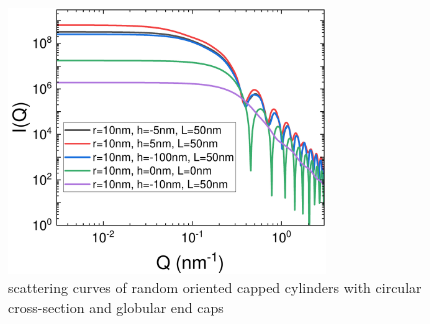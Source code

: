 \begin{figure}[htb]
\begin{center}
\includegraphics[width=0.75\textwidth]{../images/form_factor/cylindrical_obj/capped_cylinder_IQ.pdf}
\end{center}
\caption{scattering curves of random oriented capped cylinders with circular cross-section and globular end caps}
\label{fig:capped_cylinder_IQ}
\end{figure}

\clearpage

